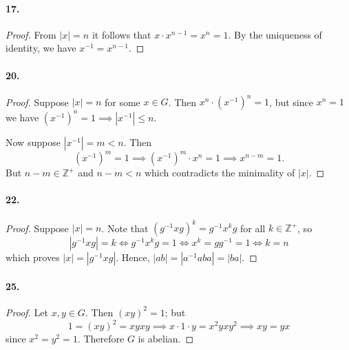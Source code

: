 \documentclass{article}
\begin{document}
\paragraph{17.}
\begin{proof}
  From $|x| = n$ it follows that $x \cdot x^{n-1} = x^n = 1$. By the uniqueness
  of identity, we have $x^{-1} = x^{n-1}$.
\end{proof}

\paragraph{20.}
\begin{proof}
  Suppose $|x| = n$ for some $x \in G$. Then $x^n \cdot (x^{-1})^n = 1$, but
  since $x^n = 1$ we have $(x^{-1})^n = 1 \implies |x^{-1}| \leq n$.

  Now suppose $|x^{-1}| = m < n$. Then \[
    (x^{-1})^m = 1 \implies (x^{-1})^m \cdot x^n = 1 \implies x^{n-m} = 1.
  \] But $n - m \in \mathbb{Z}^+$ and $n - m < n$ which contradicts the
  minimality of $|x|$.
\end{proof}

\paragraph{22.}
\begin{proof}
  Suppose $|x| = n$. Note that $(g^{-1}xg)^k = g^{-1}x^kg$ for all $k \in
  \mathbb{Z}^+$, so \[
    |g^{-1}xg| = k \iff g^{-1}x^kg = 1 \iff x^k = gg^{-1} = 1 \iff k = n
  \] which proves $|x| = |g^{-1}xg|$. Hence, $|ab| = |a^{-1}aba| = |ba|$.
\end{proof}

\paragraph{25.}
\begin{proof}
  Let $x, y \in G$. Then $(xy)^2 = 1$; but \[
    1 = (xy)^2 = xyxy \implies x \cdot 1 \cdot y = x^2yxy^2 \implies xy = yx
  \] since $x^2 = y^2 = 1$. Therefore $G$ is abelian.
\end{proof}
\end{document}
